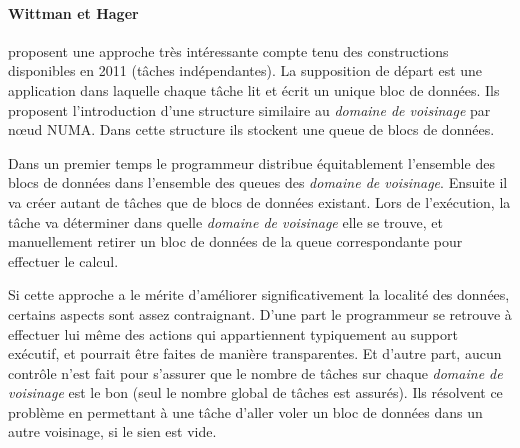 \paragraph{Wittman et Hager~\cite{Wittmann2011}} proposent une approche très intéressante compte tenu des constructions disponibles en 2011 (tâches indépendantes).
La supposition de départ est une application dans laquelle chaque tâche lit et écrit un unique bloc de données.
Ils proposent l'introduction d'une structure similaire au \emph{domaine de voisinage} par nœud NUMA.
Dans cette structure ils stockent une queue de blocs de données.

Dans un premier temps le programmeur distribue équitablement l'ensemble des blocs de données dans l'ensemble des queues des \emph{domaine de voisinage}.
Ensuite il va créer autant de tâches que de blocs de données existant.
Lors de l'exécution, la tâche va déterminer dans quelle \emph{domaine de voisinage} elle se trouve, et manuellement retirer un bloc de données de la queue correspondante pour effectuer le calcul.

Si cette approche a le mérite d'améliorer significativement la localité des données, certains aspects sont assez contraignant.
D'une part le programmeur se retrouve à effectuer lui même des actions qui appartiennent typiquement au support exécutif, et pourrait être faites de manière transparentes.
Et d'autre part, aucun contrôle n'est fait pour s'assurer que le nombre de tâches sur chaque \emph{domaine de voisinage} est le bon (seul le nombre global de tâches est assurés).
Ils résolvent ce problème en permettant à une tâche d'aller voler un bloc de données dans un autre voisinage, si le sien est vide.


